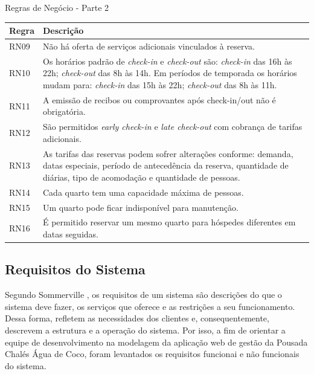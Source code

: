\documentclass[
	12pt,				%
	openany,			%
	oneside,			%
	a4paper,			%
	english,			%
	french,				%
	spanish,			%
	brazil				%
	]{abntex2}
\begin{document}
\begin{quadro}[H]
	\caption{\label{quadro_rn_2}Regras de Negócio - Parte 2}
	\begin{tabular}{|>{\centering\arraybackslash}p{3cm}|p{11cm}|}
		\hline
		\textbf{Regra} & \textbf{Descrição} 
		 \\ \hline	
		RN09 & Não há oferta de serviços adicionais vinculados à reserva.  
		 \\ \hline
		RN10 & Os horários padrão de \textit{check-in} e \textit{check-out} são: \textit{check-in} das 16h às 22h; \textit{check-out} das 8h às 14h. Em períodos de temporada os horários mudam para: \textit{check-in} das 15h às 22h; \textit{check-out} das 8h às 11h.
		\\ \hline
		RN11 & A emissão de recibos ou comprovantes após check-in/out não é obrigatória.  
		 \\ \hline
		RN12 & São permitidos \textit{early check-in} e \textit{late check-out} com cobrança de tarifas adicionais.  
		 \\ \hline
		RN13 & As tarifas das reservas podem sofrer alterações conforme: demanda, datas especiais, período de antecedência da reserva, quantidade de diárias, tipo de acomodação e quantidade de pessoas.  
		 \\ \hline
		RN14 & Cada quarto tem uma capacidade máxima de pessoas.  
		 \\ \hline
		 RN15 &  Um quarto pode ficar indisponível para manutenção. 
		 \\ \hline
		RN16 & É permitido reservar um mesmo quarto para hóspedes diferentes em datas seguidas.  
		 \\ \hline	
	\end{tabular}
\end{quadro}
\subsection{Requisitos do Sistema}
Segundo Sommerville \cite[p.57]{sommerville2011}, os requisitos de um sistema são descrições do que o sistema deve fazer, os serviços que oferece e as restrições a seu funcionamento. Dessa forma, refletem as necessidades dos clientes e, consequentemente, descrevem a estrutura e a operação do sistema. Por isso, a fim de orientar a equipe de desenvolvimento na modelagem da aplicação web de gestão da Pousada Chalés Água de Coco, foram levantados os requisitos funcionai e não funcionais do sistema.
\end{document}

